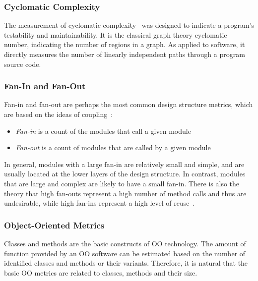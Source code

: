 \documentclass[sle]{llncs}
\begin{document}
\subsubsection{Cyclomatic Complexity}
The measurement of cyclomatic complexity~\cite{mccabe1976complexity} was designed to indicate a program's testability and maintainability.
It is the classical graph theory cyclomatic number, indicating the number of regions in a graph.
As applied to software, it directly measures the number of linearly independent paths through a program source code.

\subsubsection{Fan-In and Fan-Out}
Fan-in and fan-out are perhaps the most common design structure metrics, which are based on the ideas of coupling~\cite{yourdon1979structured}: 
\begin{itemize}
\item \emph{Fan-in } is a count of the modules that call a given module 
\item \emph{Fan-out} is a count of modules that are called by a given module 
\end{itemize}

In general, modules with a large fan-in are relatively small and simple, and are usually located at the lower layers of the design structure. 
In contrast, modules that are large and complex are likely to have a small fan-in. 
There is also the theory that high fan-outs represent a high number of method calls and thus are undesirable, 
while high fan-ins represent a high level of reuse~\cite{wang2007dynamic}.

\subsubsection{Object-Oriented Metrics}
Classes and methods are the basic constructs of OO technology. 
The amount of function provided by an OO software can be estimated based on the number of identified classes and methods or their variants.
Therefore, it is natural that the basic OO metrics are related to classes, methods and their size.
\end{document}
